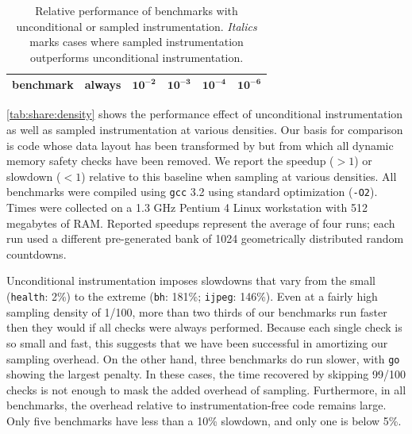 \begin{table}
  \centering
  \begin{tabular}{|l|r|rrrr|}
    \hline
    \rule{0pt}{2.5ex}
    \textbf{benchmark} & \textbf{always} & $\mathbf{10^{-2}}$ & $\mathbf{10^{-3}}$ & $\mathbf{10^{-4}}$ & $\mathbf{10^{-6}}$ \\
    \hline\hline
    
  \end{tabular}
  \caption{Relative performance of \CCured benchmarks with
    unconditional or sampled instrumentation.  \textit{Italics} marks
    cases where sampled instrumentation outperforms unconditional
    instrumentation.}
  \label{tab:share:density}
\end{table}

\autoref{tab:share:density} shows the performance effect of
unconditional instrumentation as well as sampled instrumentation at
various densities.  Our basis for comparison is code whose data layout
has been transformed by \CCured but from which all dynamic memory
safety checks have been removed.  We report the speedup ($>1$) or
slowdown ($<1$) relative to this baseline when sampling at various
densities.  All benchmarks were compiled using \texttt{gcc} 3.2 using
standard optimization (\texttt{-O2}).  Times were collected on a 1.3
GHz Pentium 4 Linux workstation with 512 megabytes of RAM\@.  Reported
speedups represent the average of four runs; each run used a different
pre-generated bank of 1024 geometrically distributed random
countdowns.

Unconditional instrumentation imposes slowdowns that vary from the
small (\texttt{health}: 2\%) to the extreme (\texttt{bh}: 181\%;
\texttt{ijpeg}: 146\%).  Even at a fairly high sampling density of
1/100, more than two thirds of our benchmarks run faster then they
would if all checks were always performed.  Because each single check
is so small and fast, this suggests that we have been successful in
amortizing our sampling overhead.  On the other hand, three benchmarks
do run slower, with \texttt{go} showing the largest penalty.  In these
cases, the time recovered by skipping 99/100 checks is not enough to
mask the added overhead of sampling.  Furthermore, in all benchmarks,
the overhead relative to instrumentation-free code remains large.
Only five benchmarks have less than a 10\% slowdown, and only one is
below 5\%.

